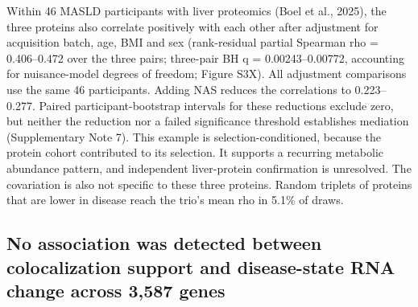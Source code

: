 Within 46 MASLD participants with liver proteomics (Boel et al., 2025), the three proteins also correlate positively with each other after adjustment for acquisition batch, age, BMI and sex (rank-residual partial Spearman rho = 0.406--0.472 over the three pairs; three-pair BH q = 0.00243--0.00772, accounting for nuisance-model degrees of freedom; Figure S3X). All adjustment comparisons use the same 46 participants. Adding NAS reduces the correlations to 0.223--0.277. Paired participant-bootstrap intervals for these reductions exclude zero, but neither the reduction nor a failed significance threshold establishes mediation (Supplementary Note 7). This example is selection-conditioned, because the protein cohort contributed to its selection. It supports a recurring metabolic abundance pattern, and independent liver-protein confirmation is unresolved. The covariation is also not specific to these three proteins. Random triplets of proteins that are lower in disease reach the trio's mean rho in 5.1\% of draws.

\subsection{No association was detected between colocalization support and disease-state RNA change across 3,587 genes}\label{no-association-was-detected-between-colocalization-support-and-disease-state-rna-change-across-3589-genes}

